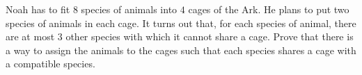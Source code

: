 \documentclass[varwidth]{standalone}
\begin{document}
    Noah has to fit $8$ species of animals into $4$ cages of the Ark. He plans to put two species of animals in each cage. It turns out that, for each species of animal, there are at most $3$ other species with which it cannot share a cage. Prove that there is a way to assign the animals to the cages such that each species shares a cage with a compatible species.
\end{document}
